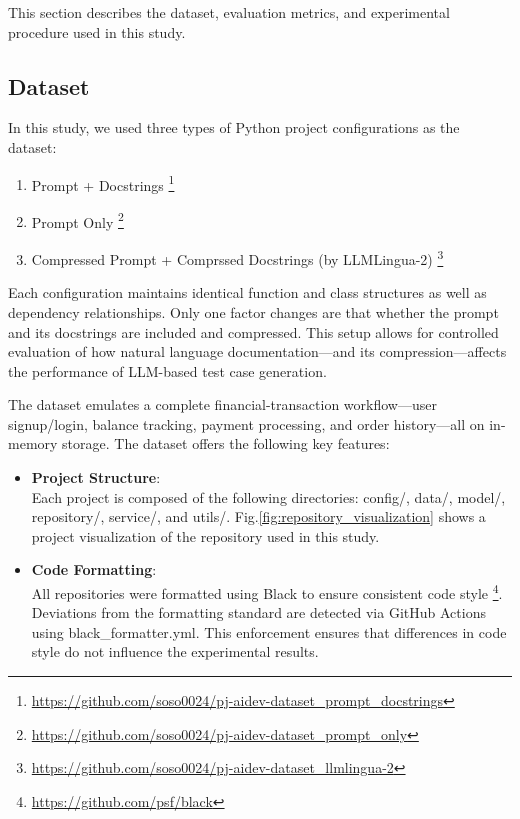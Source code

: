 This section describes the dataset, evaluation metrics, and experimental procedure used in this study.

\subsection{Dataset}

In this study, we used three types of Python project configurations as the dataset:

\begin{enumerate}
    \item Prompt + Docstrings \footnote{\url{https://github.com/soso0024/pj-aidev-dataset_prompt_docstrings}}
\vspace{0.2cm}
    \item Prompt Only \footnote{\url{https://github.com/soso0024/pj-aidev-dataset_prompt_only}}
\vspace{0.2cm}
    \item Compressed Prompt + Comprssed Docstrings (by LLMLingua-2) \footnote{\url{https://github.com/soso0024/pj-aidev-dataset_llmlingua-2}}
\end{enumerate}

Each configuration maintains identical function and class structures as well as dependency relationships. Only one factor changes are that whether the prompt and its docstrings are included and compressed. This setup allows for controlled evaluation of how natural language documentation—and its compression—affects the performance of LLM-based test case generation. 

The dataset emulates a complete financial-transaction workflow—user signup/login, balance tracking, payment processing, and order history—all on in-memory storage. The dataset offers the following key features:

\begin{itemize}[label={$\bullet$}]
    \item \textbf{Project Structure}:\\Each project is composed of the following directories: config/, data/, model/, repository/, service/, and utils/. Fig.\ref{fig:repository_visualization} shows a project visualization of the repository used in this study.
\vspace{0.2cm}
    \item \textbf{Code Formatting}:\\All repositories were formatted using Black to ensure consistent code style \footnote{\url{https://github.com/psf/black}}. Deviations from the formatting standard are detected via GitHub Actions using black\_formatter.yml. This enforcement ensures that differences in code style do not influence the experimental results.
\end{itemize}

